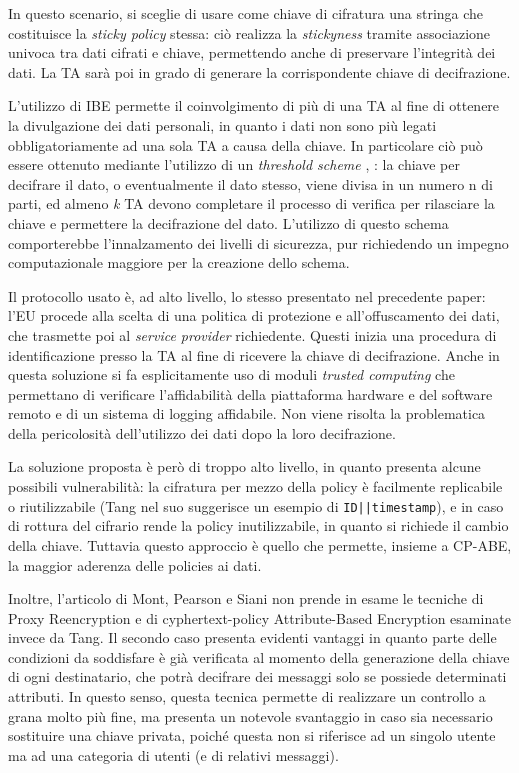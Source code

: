 In questo scenario, si sceglie di usare come chiave di cifratura una stringa che costituisce la \textit{sticky policy} stessa: ci\`o realizza la \textit{stickyness} tramite associazione univoca tra dati cifrati e chiave, permettendo anche di preservare l’integrit\`a dei dati. La TA sar\`a poi in grado di generare la corrispondente chiave di decifrazione.

L’utilizzo di IBE permette il coinvolgimento di pi\`u di una TA al fine di ottenere la divulgazione dei dati personali, in quanto i dati non sono pi\`u legati obbligatoriamente ad una sola TA a causa della chiave. In particolare ci\`o può essere ottenuto mediante l’utilizzo di un \textit{threshold scheme} \cite{shamir1979share}, \cite{sahai2005fuzzy}: la chiave per decifrare il dato, o eventualmente il dato stesso, viene divisa in un numero n di parti, ed almeno \textit{k} TA devono completare il processo di verifica per rilasciare la chiave e permettere la decifrazione del dato. L’utilizzo di questo schema comporterebbe l’innalzamento dei livelli di sicurezza, pur richiedendo un impegno computazionale maggiore per la creazione dello schema.

Il protocollo usato \`e, ad alto livello, lo stesso presentato nel precedente paper: l’EU procede alla scelta di una politica di protezione e all’offuscamento dei dati, che trasmette poi al \textit{service provider} richiedente. Questi inizia una procedura di identificazione presso la TA al fine di ricevere la chiave di decifrazione. Anche in questa soluzione si fa esplicitamente uso di moduli \textit{trusted computing} che permettano di verificare l’affidabilit\`a della piattaforma hardware e del software remoto e di un sistema di logging affidabile. Non viene risolta la problematica della pericolosit\`a dell’utilizzo dei dati dopo la loro decifrazione.

La soluzione proposta \`e per\`o di troppo alto livello, in quanto presenta alcune possibili vulnerabilit\`a: la cifratura per mezzo della policy \`e facilmente replicabile o riutilizzabile (Tang nel suo \cite{tang2008using} suggerisce un esempio di \texttt{ID||timestamp}), e in caso di rottura del cifrario rende la policy inutilizzabile, in quanto si richiede il cambio della chiave. Tuttavia questo approccio \`e quello che permette, insieme a CP-ABE, la maggior aderenza delle policies ai dati.

Inoltre, l’articolo di Mont, Pearson e Siani non prende in esame le tecniche di Proxy Reencryption \cite{green2007identity} e di cyphertext-policy Attribute-Based Encryption \cite{bethencourt2007ciphertext} esaminate invece da Tang. Il secondo caso presenta evidenti vantaggi in quanto parte delle condizioni da soddisfare \`e gi\`a verificata al momento della generazione della chiave di ogni destinatario, che potr\`a decifrare dei messaggi solo se possiede determinati attributi. In questo senso, questa tecnica permette di realizzare un controllo a grana molto pi\`u fine, ma presenta un notevole svantaggio in caso sia necessario sostituire una chiave privata, poich\'e questa non si riferisce ad un singolo utente ma ad una categoria di utenti (e di relativi messaggi).

